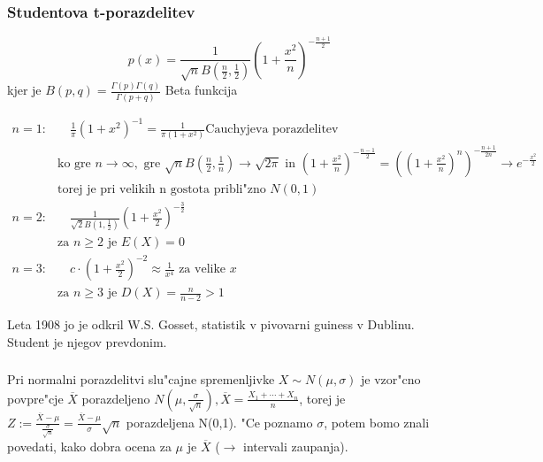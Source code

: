 \documentclass[a4paper,12pt]{article}
\theoremstyle{definition}
\theoremstyle{remark}
\begin{document}

\subsubsection*{Studentova t-porazdelitev}

\begin{equation*}
    p(x) = \frac{1}{\sqrt{n} B(\frac{n}{2},\frac{1}{2})} (1 + \frac{x^2}{n})^{-\frac{n+1}{2}}
\end{equation*}
kjer je $B(p,q) = \frac{\Gamma(p) \Gamma(q)}{\Gamma(p+q)}$ Beta funkcija

\begin{align*}
    n = 1: &\quad \frac{1}{\pi} (1+x^2)^{-1} = \frac{1}{\pi (1+x^2)} \text{Cauchyjeva porazdelitev} \\
    &\text{ko gre } n \to \infty, \text{ gre } \sqrt{n} B(\frac{n}{2},\frac{1}{n}) \to \sqrt{2 \pi}
        \text{ in } (1 + \frac{x^2}{n})^{-\frac{n-1}{2}} = ((1 + \frac{x^2}{n})^n)^{-\frac{n+1}{2n}}
        \to e^{-\frac{x^2}{2}} \\
    &\text{torej je pri velikih n gostota pribli"zno } N(0,1) \\
    n = 2: &\quad \frac{1}{\sqrt{2} B(1,\frac{1}{2})} (1 + \frac{x^2}{2})^{-\frac{3}{2}} \\
    &\text{za } n \geq 2 \text{ je } E(X) = 0 \\
    n = 3: &\quad c \cdot (1 + \frac{x^2}{2})^{-2} \approx \frac{1}{x^4} \text{ za velike } x \\
    &\text{za } n \geq 3 \text{ je } D(X) = \frac{n}{n-2} > 1
\end{align*}

Leta 1908 jo je odkril W.S. Gosset, statistik v pivovarni guiness v Dublinu. Student je njegov prevdonim.

\subsubsection*{}

Pri normalni porazdelitvi slu"cajne spremenljivke $X \sim N(\mu, \sigma)$ je vzor"cno povpre"cje  $\overline{X}$
porazdeljeno $N(\mu, \frac{\sigma}{\sqrt{n}}), \overline{X} = \frac{X_1 + \cdots + X_n}{n}$, torej je
$Z := \frac{\overline{X} - \mu}{\frac{\sigma}{\sqrt{n}}} = \frac{\overline{X} - \mu}{\sigma} \sqrt{n}$
porazdeljena N(0,1). "Ce poznamo $\sigma$, potem bomo znali povedati, kako dobra ocena za $\mu$ je $\overline{X}$
($\to$ intervali zaupanja). \\
\end{document}
